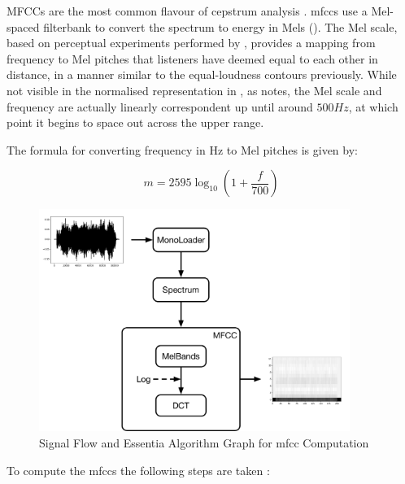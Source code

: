 {{MFCCs are the most common flavour of cepstrum analysis \citep{Kim2006}. \acrshort{mfcc}s use a Mel-spaced filterbank to convert the spectrum to energy in Mels (). The Mel scale, based on perceptual experiments performed by \cite{Stevens1937}, provides a mapping from frequency to Mel pitches that listeners have deemed equal to each other in distance, in a manner similar to the equal-loudness contours previously. While not visible in the normalised representation in , as \cite{Kim2006} notes, the Mel scale and frequency are actually linearly correspondent up until around $500Hz$, at which point it begins to space out across the upper range.

The formula for converting frequency in Hz to Mel pitches is given by:

  \begin{equation}
	\label{eq:mel}	
	m = 2595\log_{10}(1+\frac{f}{700})
	\end{equation}
	
\begin{figure}
	\begin{center}
		\includegraphics[width=0.9\textwidth]{ch05_pyconcat/figures/mfcc_diagram.pdf}
	\end{center}
	\caption[Signal Flow and Essentia Algorithm Graph for MFCC Computation ]{Signal Flow and Essentia Algorithm Graph for \acrshort{mfcc} Computation }
	\label{fig:mfcc_diagram}
\end{figure}	

To compute the \acrshort{mfcc}s the following steps are taken \citep{Logan2000, Lyons2015}:

}}
